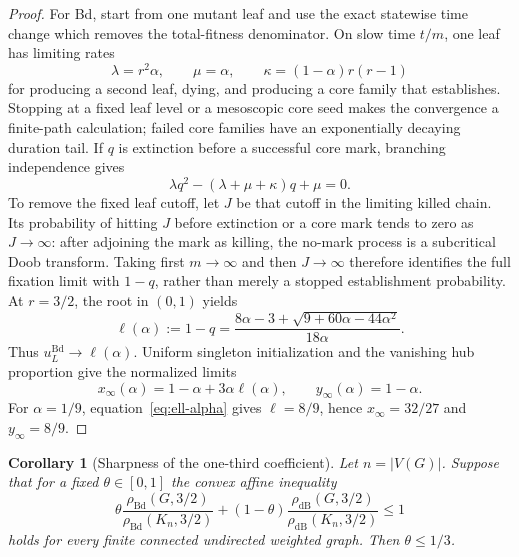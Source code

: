 \documentclass[11pt]{article}
\newtheorem{corollary}[theorem]{Corollary}
\theoremstyle{definition}
\theoremstyle{remark}
\newcommand{\Bd}{\mathrm{Bd}}
\newcommand{\dB}{\mathrm{dB}}
\begin{document}
\begin{proof}
For Bd, start from one mutant leaf and use the exact statewise time change
which removes the total-fitness denominator.  On slow time $t/m$, one leaf
has limiting rates
\begin{equation}
 \lambda=r^2\alpha,\qquad
 \mu=\alpha,\qquad
 \kappa=(1-\alpha)r(r-1)
 \label{eq:pendant-branch-rates}
\end{equation}
for producing a second leaf, dying, and producing a core family that
establishes.  Stopping at a fixed leaf level or a mesoscopic core seed makes
the convergence a finite-path calculation; failed core families have an
exponentially decaying duration tail.  If $q$ is extinction before a
successful core mark, branching independence gives
\[
\lambda q^2-(\lambda+\mu+\kappa)q+\mu=0.
\]
To remove the fixed leaf cutoff, let $J$ be that cutoff in the limiting
killed chain.  Its probability of hitting $J$ before extinction or a core
mark tends to zero as $J\to\infty$: after adjoining the mark as killing, the
no-mark process is a subcritical Doob transform.  Taking first $m\to\infty$
and then $J\to\infty$ therefore identifies the full fixation limit with
$1-q$, rather than merely a stopped establishment probability.
At $r=3/2$, the root in $(0,1)$ yields
\begin{equation}
 \ell(\alpha):=1-q
 =\frac{8\alpha-3+\sqrt{9+60\alpha-44\alpha^2}}{18\alpha}.
 \label{eq:ell-alpha}
\end{equation}
Thus $u_L^{\Bd}\to\ell(\alpha)$.  Uniform singleton initialization and the
vanishing hub proportion give the normalized limits
\begin{equation}
 x_\infty(\alpha)=1-\alpha+3\alpha\ell(\alpha),\qquad
 y_\infty(\alpha)=1-\alpha.
 \label{eq:pendant-normalized-limits}
\end{equation}
For $\alpha=1/9$, equation~\eqref{eq:ell-alpha} gives
$\ell=8/9$, hence $x_\infty=32/27$ and $y_\infty=8/9$.
\end{proof}

\begin{corollary}[Sharpness of the one-third coefficient]
\label{cor:affine-sharpness}
Let $n=|V(G)|$.  Suppose that for a fixed $\theta\in[0,1]$ the convex affine
inequality
\begin{equation}
 \theta\frac{\rho_{\Bd}(G,3/2)}{\rho_{\Bd}(K_n,3/2)}
 +(1-\theta)\frac{\rho_{\dB}(G,3/2)}{\rho_{\dB}(K_n,3/2)}\leq1
 \label{eq:affine-separator}
\end{equation}
holds for every finite connected undirected weighted graph.  Then
$\theta\leq1/3$.
\end{corollary}
\end{document}
